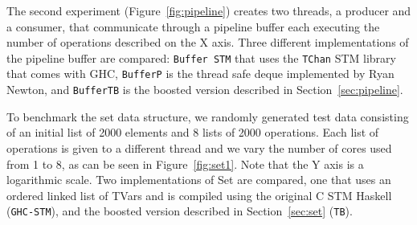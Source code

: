 \documentclass{llncs}
\begin{document}
The second experiment (Figure~\ref{fig:pipeline}) creates two threads, a producer and a consumer, that communicate
through a pipeline buffer each executing the number of operations described on the X axis. Three different
implementations of the pipeline buffer are compared: {\tt Buffer STM} that uses the {\tt TChan} STM library
that comes with GHC, {\tt BufferP} is the thread safe deque implemented by Ryan Newton, and {\tt BufferTB} is
the boosted version described in Section~\ref{sec:pipeline}.



To benchmark the set data structure, we randomly generated test data
consisting of an initial list of 2000 elements and 8 lists of 2000
operations. Each list of operations is given to a different thread and
we vary the number of cores used from 1 to 8, as can be seen in Figure~\ref{fig:set1}.
 Note that the Y axis is a logarithmic scale. Two implementations of
Set are compared, one that uses an ordered linked list of TVars and is compiled
using the original C STM Haskell ({\tt GHC-STM}), and the boosted version described in
Section~\ref{sec:set} ({\tt TB}).
\end{document}
